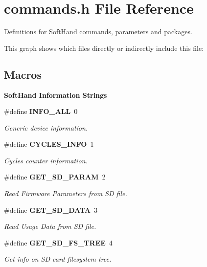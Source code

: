 \section{commands.\+h File Reference}
\label{commands_8h}


Definitions for Soft\+Hand commands, parameters and packages.  


This graph shows which files directly or indirectly include this file\+:
\subsection*{Macros}
\begin{Indent}\textbf{ Soft\+Hand Information Strings}\par
\begin{DoxyCompactItemize}
\item 
\mbox{\label{commands_8h_a2ba44fc5b8a316bd307d0baa9ab629ef}} 
\#define \textbf{ I\+N\+F\+O\+\_\+\+A\+LL}~0
\begin{DoxyCompactList}\small\item\em Generic device information. \end{DoxyCompactList}\item 
\mbox{\label{commands_8h_a3a52d8c1fc0a681a8b8bdb9434ec1ee6}} 
\#define \textbf{ C\+Y\+C\+L\+E\+S\+\_\+\+I\+N\+FO}~1
\begin{DoxyCompactList}\small\item\em Cycles counter information. \end{DoxyCompactList}\item 
\mbox{\label{commands_8h_ab4bb7fa515198a57be2407a640e6910e}} 
\#define \textbf{ G\+E\+T\+\_\+\+S\+D\+\_\+\+P\+A\+R\+AM}~2
\begin{DoxyCompactList}\small\item\em Read Firmware Parameters from SD file. \end{DoxyCompactList}\item 
\mbox{\label{commands_8h_a3154ffe43f7cb799f7c35cfad7339f49}} 
\#define \textbf{ G\+E\+T\+\_\+\+S\+D\+\_\+\+D\+A\+TA}~3
\begin{DoxyCompactList}\small\item\em Read Usage Data from SD file. \end{DoxyCompactList}\item 
\mbox{\label{commands_8h_abb8f46ce96d5f85985e3a2c7e7f9da43}} 
\#define \textbf{ G\+E\+T\+\_\+\+S\+D\+\_\+\+F\+S\+\_\+\+T\+R\+EE}~4
\begin{DoxyCompactList}\small\item\em Get info on SD card filesystem tree. \end{DoxyCompactList}\end{DoxyCompactItemize}
\end{Indent}
